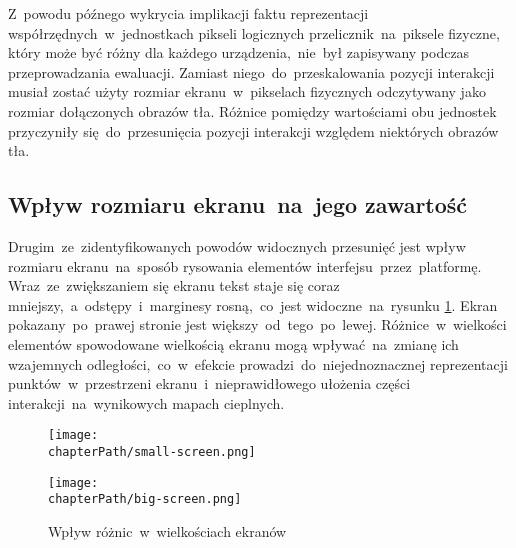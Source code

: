 Z~powodu późnego wykrycia implikacji faktu reprezentacji współrzędnych~w~jednostkach pikseli logicznych przelicznik~na~piksele fizyczne, który może być różny dla każdego urządzenia,~nie~był zapisywany podczas przeprowadzania ewaluacji. Zamiast niego~do~przeskalowania pozycji interakcji musiał zostać użyty rozmiar ekranu~w~pikselach fizycznych odczytywany jako rozmiar dołączonych obrazów tła. Różnice pomiędzy wartościami obu jednostek przyczyniły się~do~przesunięcia pozycji interakcji względem niektórych obrazów tła.

\subsection{Wpływ rozmiaru ekranu~na~jego zawartość}
Drugim~ze~zidentyfikowanych powodów widocznych przesunięć jest wpływ rozmiaru ekranu~na~sposób rysowania elementów interfejsu~przez~platformę. Wraz~ze~zwiększaniem się ekranu tekst staje się coraz mniejszy,~a~odstępy~i~marginesy rosną,~co~jest widoczne~na~rysunku \ref{fig:screen_sizes}. Ekran pokazany~po~prawej stronie jest większy~od~tego~po~lewej. Różnice~w~wielkości elementów spowodowane wielkością ekranu mogą wpływać~na~zmianę ich wzajemnych odległości,~co~w~efekcie prowadzi~do~niejednoznacznej reprezentacji punktów~w~przestrzeni ekranu~i~nieprawidłowego ułożenia części interakcji~na~wynikowych mapach cieplnych.

\bigskip
\begin{figure}[H]
\centering
\begin{minipage}{.43\textwidth}
	\centering
	\texttt{[image: \\chapterPath/small-screen.png]}
\end{minipage}
\begin{minipage}{.48\textwidth}
	\centering
	\texttt{[image: \\chapterPath/big-screen.png]}
\end{minipage}
\bigskip
\caption{Wpływ różnic~w~wielkościach ekranów}
\label{fig:screen_sizes}
\end{figure}
